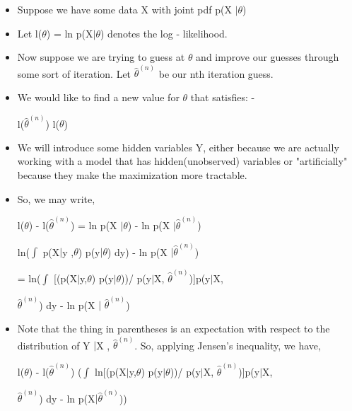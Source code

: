 \vspace{5 mm}
\begin{itemize}
    \item Suppose we have some data X with joint pdf p(X \(|\)$\theta$)
    \item Let l($\theta$) = ln p(X\(|\)$\theta$) denotes the log - likelihood.
    \item Now suppose we are trying to guess at $\theta$ and improve our guesses through some sort of iteration. Let ${\hat{\theta}}^{(n)}$ be our nth iteration guess.
    \item We would like to find a new value for $\theta $ that satisfies: - 
    
   \hspace{35 mm}  l(${\hat{\theta}}^{(n)}$) \le l($\theta$)
    \item We will introduce some hidden variables Y, either because we are actually working with a model that has hidden(unobserved) variables or "artificially" because they make the maximization more tractable.
    \item So, we may write, 

   \hspace{20 mm} l($\theta$) - l(${\hat{\theta}}^{(n)}$) = ln p(X \(|\)$\theta$) - ln p(X \(|\)${\hat{\theta}}^{(n)}$)

   \hspace{40 mm} ln($\int$ p(X\(|\)y ,$\theta$) p(y\(|\)$\theta$) dy) - ln p(X \(|\)${\hat{\theta}}^{(n)}$)

    \hspace{41 mm}= ln($\int$ [(p(X\(|\)y,$\theta$) p(y\(|\)$\theta$))/ p(y\(|\)X, ${\hat{\theta}}^{(n)}$)]p(y\(|\)X,
    
    \hspace{43 mm} ${\hat{\theta}}^{(n)}$) dy  - ln p(X \(|\) ${\hat{\theta}}^{(n)}$)

    \item Note that the thing in parentheses is an expectation with respect to the distribution of Y \(|\)X , ${\hat{\theta}}^{(n)}$. So, applying Jensen's inequality, we have,

    \hspace{20 mm} l($\theta$) - l(${\hat{\theta}}^{(n)}$) \ge ($\int$ ln[(p(X\(|\)y,$\theta$) p(y\(|\)$\theta$))/ p(y\(|\)X, ${\hat{\theta}}^{(n)}$)]p(y\(|\)X,
    
    \hspace{43 mm} ${\hat{\theta}}^{(n)}$) dy  - ln p(X\(|\)${\hat{\theta}}^{(n)}$))


\end{itemize}
